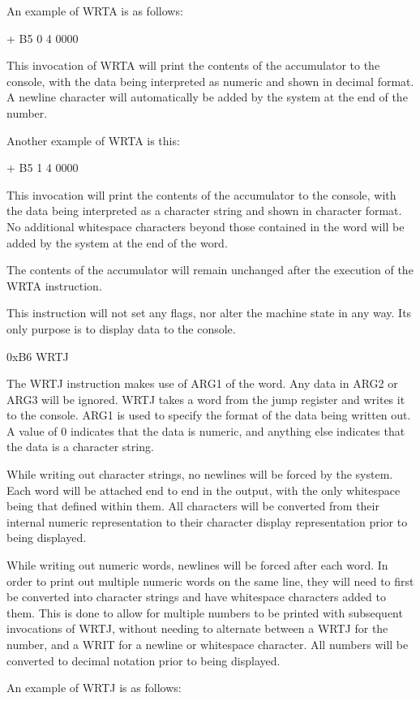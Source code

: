 \documentclass[]{article}
\begin{document}
An example of WRTA is as follows:

+ B5 0 4 0000

This invocation of WRTA will print the contents of the accumulator to
the console, with the data being interpreted as numeric and shown in
decimal format. A newline character will automatically be added by the
system at the end of the number.

Another example of WRTA is this:

+ B5 1 4 0000

This invocation will print the contents of the accumulator to the
console, with the data being interpreted as a character string and shown
in character format. No additional whitespace characters beyond those
contained in the word will be added by the system at the end of the
word.

The contents of the accumulator will remain unchanged after the
execution of the WRTA instruction.

This instruction will not set any flags, nor alter the machine state in
any way. Its only purpose is to display data to the console.

0xB6 WRTJ

The WRTJ instruction makes use of ARG1 of the word. Any data in ARG2 or
ARG3 will be ignored. WRTJ takes a word from the jump register and
writes it to the console. ARG1 is used to specify the format of the data
being written out. A value of 0 indicates that the data is numeric, and
anything else indicates that the data is a character string.

While writing out character strings, no newlines will be forced by the
system. Each word will be attached end to end in the output, with the
only whitespace being that defined within them. All characters will be
converted from their internal numeric representation to their character
display representation prior to being displayed.

While writing out numeric words, newlines will be forced after each
word. In order to print out multiple numeric words on the same line,
they will need to first be converted into character strings and have
whitespace characters added to them. This is done to allow for multiple
numbers to be printed with subsequent invocations of WRTJ, without
needing to alternate between a WRTJ for the number, and a WRIT for a
newline or whitespace character. All numbers will be converted to
decimal notation prior to being displayed.

An example of WRTJ is as follows:
\end{document}
